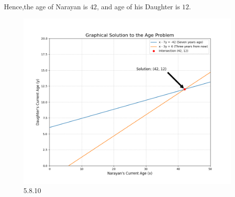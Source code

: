 \documentclass[journal]{IEEEtran}
\begin{document}
Hence,the age of Narayan is $42$, and age of his Daughter is $12$.
\begin{figure}[H]
    \centering
    \includegraphics[width=0.85\columnwidth]{figs/graph12.png}
    \caption{5.8.10}
    \label{fig:placeholder}
\end{figure}
\end{document}
